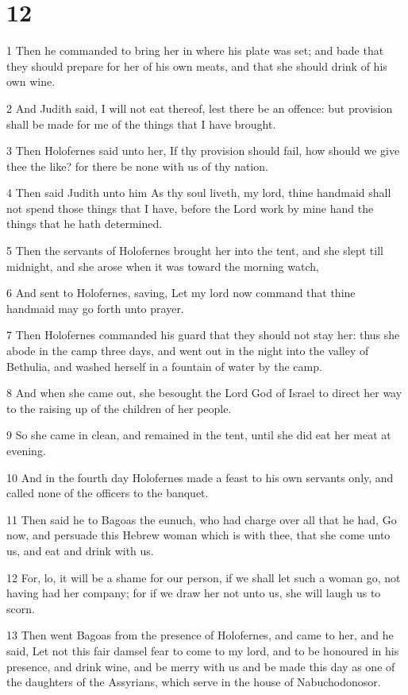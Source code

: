 \chapter{12}

\par 1 Then he commanded to bring her in where his plate was set; and bade that they should prepare for her of his own meats, and that she should drink of his own wine.
\par 2 And Judith said, I will not eat thereof, lest there be an offence: but provision shall be made for me of the things that I have brought.
\par 3 Then Holofernes said unto her, If thy provision should fail, how should we give thee the like? for there be none with us of thy nation.
\par 4 Then said Judith unto him As thy soul liveth, my lord, thine handmaid shall not spend those things that I have, before the Lord work by mine hand the things that he hath determined.
\par 5 Then the servants of Holofernes brought her into the tent, and she slept till midnight, and she arose when it was toward the morning watch,
\par 6 And sent to Holofernes, saving, Let my lord now command that thine handmaid may go forth unto prayer.
\par 7 Then Holofernes commanded his guard that they should not stay her: thus she abode in the camp three days, and went out in the night into the valley of Bethulia, and washed herself in a fountain of water by the camp.
\par 8 And when she came out, she besought the Lord God of Israel to direct her way to the raising up of the children of her people.
\par 9 So she came in clean, and remained in the tent, until she did eat her meat at evening.
\par 10 And in the fourth day Holofernes made a feast to his own servants only, and called none of the officers to the banquet.
\par 11 Then said he to Bagoas the eunuch, who had charge over all that he had, Go now, and persuade this Hebrew woman which is with thee, that she come unto us, and eat and drink with us.
\par 12 For, lo, it will be a shame for our person, if we shall let such a woman go, not having had her company; for if we draw her not unto us, she will laugh us to scorn.
\par 13 Then went Bagoas from the presence of Holofernes, and came to her, and he said, Let not this fair damsel fear to come to my lord, and to be honoured in his presence, and drink wine, and be merry with us and be made this day as one of the daughters of the Assyrians, which serve in the house of Nabuchodonosor.
